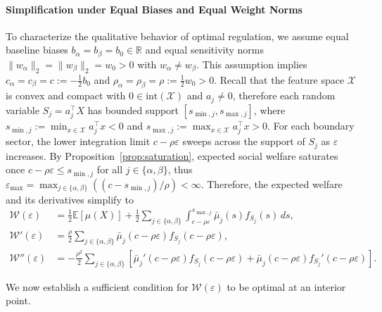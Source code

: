 \paragraph{Simplification under Equal Biases and Equal Weight Norms}
To characterize the qualitative behavior of optimal regulation, we assume equal baseline biases $b_\alpha = b_\beta = b_0 \in \mathbb{R}$ and equal sensitivity norms $\|w_\alpha\|_2 = \|w_\beta\|_2 = w_0 > 0$ with $w_\alpha \neq w_\beta$. This assumption implies $c_\alpha = c_\beta = c := -\frac{1}{2} b_0$ and $\rho_\alpha = \rho_\beta = \rho := \frac{1}{2} w_0 > 0$. Recall that the feature space $\mathcal{X}$ is convex and compact with $0 \in \mathrm{int}(\mathcal{X})$ and $a_j \neq 0$, therefore each random variable $S_j = a_j^\top X$ has bounded support $[s_{\min, j}, s_{\max, j}]$, where $s_{\min, j} := \min_{x \in \mathcal{X}} a_j^\top x < 0$ and $s_{\max, j} := \max_{x \in \mathcal{X}} a_j^\top x > 0$. For each boundary sector, the lower integration limit $c - \rho \varepsilon$ sweeps across the support of $S_j$ as $\varepsilon$ increases. By Proposition~\ref{prop:saturation}, expected social welfare saturates once $c - \rho \varepsilon \le s_{\min, j}$ for all $j \in \{\alpha, \beta\}$, thus $\varepsilon_{\max} = \max_{j\in\{\alpha,\beta\}} ((c - s_{\min, j})/\rho) < \infty$. Therefore, the expected welfare and its derivatives simplify to
\begin{align}
\mathcal{W}(\varepsilon) &= \frac{1}{2}\mathbb{E}[\mu(X)] + \frac{1}{2}\sum_{j\in\{\alpha,\beta\}} \int_{c - \rho \varepsilon}^{s_{\max, j}} \bar{\mu}_j(s) f_{S_j}(s)\,ds, \\
\mathcal{W}'(\varepsilon) &= \frac{\rho}{2} \sum_{j\in\{\alpha,\beta\}} \bar{\mu}_j(c - \rho \varepsilon) f_{S_j}(c - \rho \varepsilon), \label{eq:w_prime_reduced} \\
\mathcal{W}''(\varepsilon) &= -\frac{\rho^2}{2} \sum_{j\in\{\alpha,\beta\}} \left[ \bar{\mu}_j'(c - \rho \varepsilon) f_{S_j}(c - \rho \varepsilon) + \bar{\mu}_j(c - \rho \varepsilon) f_{S_j}'(c - \rho \varepsilon) \right].
\end{align}

We now establish a sufficient condition for $\mathcal{W}(\varepsilon)$ to be optimal at an interior point.


